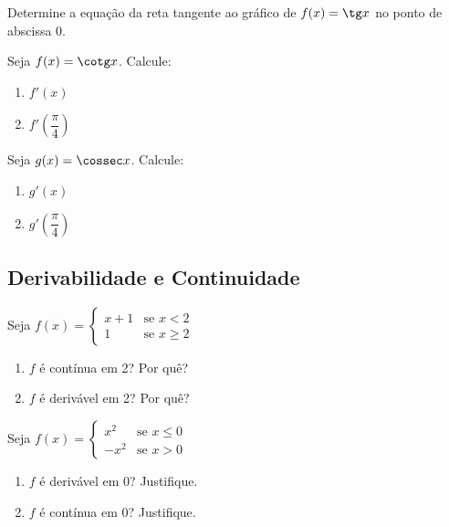 \begin{exercicio}[5]
Determine a equação da reta tangente ao gráfico de $f(x) = \tg x$ no ponto de abscissa 0.
\end{exercicio}

\begin{exercicio}[6]
Seja $f(x) = \cotg x$. Calcule:
\begin{enumerate}[label=\alph*)]
    \item $f'(x)$
    \item $f'\!\left(\dfrac{\pi}{4}\right)$
\end{enumerate}
\end{exercicio}

\begin{exercicio}[7]
Seja $g(x) = \cossec x$. Calcule:
\begin{enumerate}[label=\alph*)]
    \item $g'(x)$
    \item $g'\!\left(\dfrac{\pi}{4}\right)$
\end{enumerate}
\end{exercicio}

\clearpage

\subsection{Derivabilidade e Continuidade}

\begin{exercicio}[1]
Seja $f(x) = \begin{cases} x + 1 & \text{se } x < 2 \\ 1 & \text{se } x \ge 2 \end{cases}$
\begin{enumerate}[label=\alph*)]
    \item $f$ é contínua em 2? Por quê?
    \item $f$ é derivável em 2? Por quê?
\end{enumerate}
\end{exercicio}

\begin{exercicio}[2]
Seja $f(x) = \begin{cases} x^2 & \text{se } x \le 0 \\ -x^2 & \text{se } x > 0 \end{cases}$
\begin{enumerate}[label=\alph*)]
    \item $f$ é derivável em 0? Justifique.
    \item $f$ é contínua em 0? Justifique.
\end{enumerate}
\end{exercicio}

